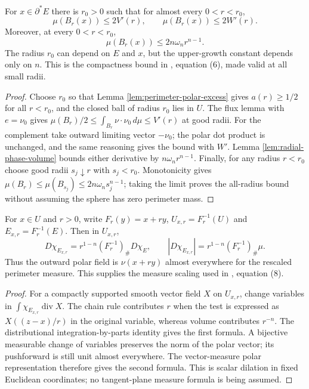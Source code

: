 \begin{proposition}\label{prop:reduced-boundary-perimeter-growth}
For $x\in\partial^*E$ there is $r_0>0$ such that for almost every $0<r<r_0$,
\[
 \mu(B_r(x))\leq2V'(r),\qquad
 \mu(B_r(x))\leq2W'(r).
\]
Moreover, at every $0<r<r_0$,
\[
 \mu(B_r(x))\leq2n\omega_n r^{n-1}.
\]
The radius $r_0$ can depend on $E$ and $x$, but the upper-growth constant depends only on $n$. This is the compactness bound in \cite{Sim18}, equation (6), made valid at all small radii.
\end{proposition}
\begin{proof}
Choose $r_0$ so that Lemma \ref{lem:perimeter-polar-excess} gives $a(r)\geq1/2$ for all $r<r_0$, and the closed ball of radius $r_0$ lies in $U$. The flux lemma with $e=\nu_0$ gives $\mu(B_r)/2\leq\int_{B_r}\nu\cdot\nu_0\,d\mu\leq V'(r)$ at good radii. For the complement take outward limiting vector $-\nu_0$; the polar dot product is unchanged, and the same reasoning gives the bound with $W'$. Lemma \ref{lem:radial-phase-volume} bounds either derivative by $n\omega_n r^{n-1}$. Finally, for any radius $r<r_0$ choose good radii $s_j\downarrow r$ with $s_j<r_0$. Monotonicity gives $\mu(B_r)\leq\mu(B_{s_j})\leq2n\omega_n s_j^{n-1}$; taking the limit proves the all-radius bound without assuming the sphere has zero perimeter mass.
\end{proof}

\begin{lemma}\label{lem:perimeter-blowup-scaling}
For $x\in U$ and $r>0$, write $F_r(y)=x+ry$, $U_{x,r}=F_r^{-1}(U)$ and $E_{x,r}=F_r^{-1}(E)$. Then in $U_{x,r}$,
\[
 D\chi_{E_{x,r}}=r^{1-n}(F_r^{-1})_\#D\chi_E,
 \qquad |D\chi_{E_{x,r}}|=r^{1-n}(F_r^{-1})_\#\mu.
\]
Thus the outward polar field is $\nu(x+ry)$ almost everywhere for the rescaled perimeter measure. This supplies the measure scaling used in \cite{Sim18}, equation (8).
\end{lemma}
\begin{proof}
For a compactly supported smooth vector field $X$ on $U_{x,r}$, change variables in $\int\chi_{E_{x,r}}\operatorname{div}X$. The chain rule contributes $r$ when the test is expressed as $X((z-x)/r)$ in the original variable, whereas volume contributes $r^{-n}$. The distributional integration-by-parts identity gives the first formula. A bijective measurable change of variables preserves the norm of the polar vector; its pushforward is still unit almost everywhere. The vector-measure polar representation therefore gives the second formula. This is scalar dilation in fixed Euclidean coordinates; no tangent-plane measure formula is being assumed.
\end{proof}
